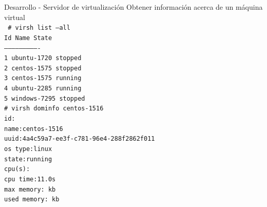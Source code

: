 \begin{frame}{Desarrollo - Servidor de virtualización}
    \vspace{-1cm} {Obtener información acerca de un máquina virtual}
    \\
    \vspace{0.5cm}
    \begingroup
    \fontsize{8pt}{8pt}\selectfont
        \texttt{
            \# virsh list --all \\
             Id\hspace{0.15cm}  Name\hspace{1.5cm} State \\
            ---------------------------- \\
             1\hspace{0.15cm}   ubuntu-1720\hspace{0.5cm}   stopped \\
             2\hspace{0.15cm}   centos-1575\hspace{0.5cm}   stopped \\
             3\hspace{0.15cm}   centos-1575\hspace{0.5cm}   running \\
             4\hspace{0.15cm}   ubuntu-2285\hspace{0.5cm}   running \\
             5\hspace{0.15cm}   windows-7295\hspace{0.38cm}  stopped \\
            \vspace{0.5cm}
             \# virsh dominfo  centos-1516  \\
             id: \\
             name:\quad centos-1516  \\
             uuid:\quad  4a4c59a7-ee3f-c781-96e4-288f2862f011 \\
             os type:\quad linux \\
             state:\quad running  \\
             cpu(s):  \\
             cpu time:\quad  11.0s \\ 
             max memory: kb  \\
             used memory: kb  \\
        }    
    \endgroup    
\end{frame}

